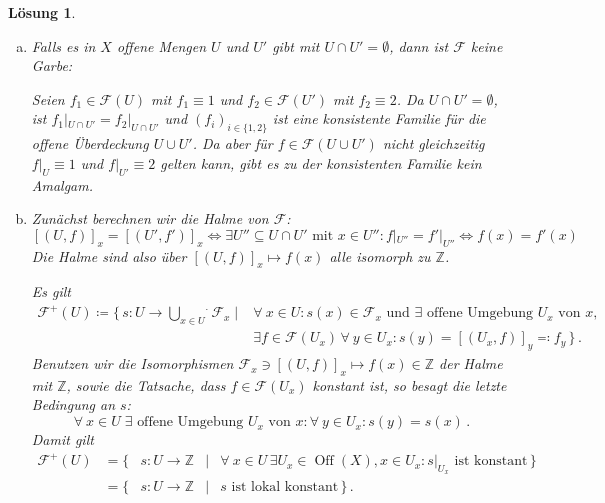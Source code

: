 \documentclass[paper = A4, fontsize=12pt, numbers=noendperiod, chapterprefix=true]{scrbook}
\theoremstyle{break}
\newtheorem{Loes}{L\"osung}
\theoremstyle{nonumberbreak}
\theoremstyle{nonumberplain}
\DeclareMathOperator{\Off}{Off}
\newcommand{\Z}{\mathbb{Z}}
\begin{document}
\begin{Loes}
\begin{enumerate}[a)]%
 \item Falls es in $X$ offene Mengen $U$ und $U'$ gibt mit $U \cap U' = \emptyset$, dann ist $\mathcal{F}$ keine Garbe:
 
 Seien $f_1 \in \mathcal{F}(U)$ mit $f_1 \equiv 1$ und $f_2 \in \mathcal{F}(U')$ mit $f_2 \equiv 2$. Da $U \cap U' = \emptyset$, ist $f_1|_{U \cap U'} = {f_2}|_{ U \cap U'}$ und $(f_i)_{i\in \{1,2\}}$ ist eine konsistente Familie f\"ur die offene \"Uberdeckung $U \cup U'$. Da aber f\"ur $f \in \mathcal{F}(U \cup U')$ nicht gleichzeitig $f|_U \equiv 1$ und $f|_{U'} \equiv 2$ gelten kann, gibt es zu der konsistenten Familie kein Amalgam.
 
 \item Zun\"achst berechnen wir die Halme von $\mathcal{F}$: 
 $$[(U,f)]_x = [(U',f')]_x \Leftrightarrow \exists U'' \subseteq U \cap U' \textrm{ mit } x \in U'' : f|_{U''} = f'|_{U''} \Leftrightarrow f(x) = f'(x)$$
 Die Halme sind also \"uber $[(U,f)]_x \mapsto f(x)$ alle isomorph zu $\Z$.
 
 Es gilt 
 $$\begin{array}{cl}
    \mathcal{F}^+(U) \coloneqq \{ \, s \colon U \to \stackrel{.}{\bigcup\limits_{x \in U}} \mathcal{F}_x \mid 
    & \forall\  x \in U : s(x) \in \mathcal{F}_x \textrm{ und } \exists \textrm{ offene Umgebung } U_x \textrm{ von } x, \\
    & \exists f \in \mathcal{F}(U_x) \, \forall\  y \in U_x : s(y) = [(U_x,f)]_y \eqqcolon f_y \, \} \, .
   \end{array}$$
 Benutzen wir die Isomorphismen $\mathcal{F}_x \ni [(U,f)]_x \mapsto f(x) \in \Z$ der Halme mit $\Z$, sowie die Tatsache, dass $f \in \mathcal{F}(U_x)$ konstant ist, so besagt die letzte Bedingung an $s$:
 $$\forall\  x \in U \; \exists \textrm{ offene Umgebung } U_x \textrm{ von } x: \forall\  y \in U_x: s(y) = s(x) \, .$$
 Damit gilt
  $$\begin{array}{rcccl}
    \mathcal{F}^+(U) &= \{ & s \colon U \to \Z &\mid 
    & \forall\  x \in U \, \exists U_x \in \Off(X), x \in U_x : s|_{U_x} \textrm{ ist konstant}\, \}\\
    &= \{ & s \colon U \to \Z & \mid & s \textrm{ ist lokal konstant} \, \} \, .
   \end{array}$$
\end{enumerate}
\end{Loes}
\end{document}
